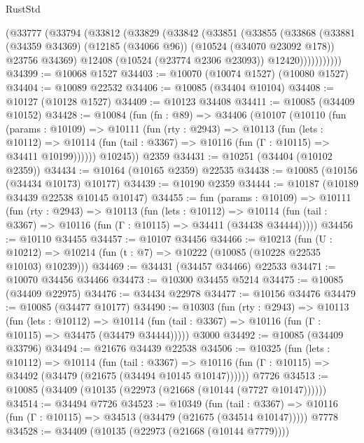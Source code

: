 \begin{lexlean}{RustStd}
\begin{coremodule}
          (@33777
            (@33794
              (@33812
                (@33829
                  (@33842
                    (@33851
                      (@33855
                        (@33868
                          (@33881
                            (@34359 @34369)
                            (@12185 (@34066 @96))
                            (@10524 (@34070 @23092 @178))
                            @23756
                            @34369)
                          @12408
                          (@10524 (@23774 @2306 @23093))
                          @12420)))))))))))
@34399 := @10068 @1527
@34403 := @10070 (@10074 @1527) (@10080 @1527)
@34404 := @10089 @22532
@34406 := @10085 (@34404 @10104)
@34408 := @10127 (@10128 @1527)
@34409 := @10123 @34408
@34411 := @10085 (@34409 @10152)
@34428 := @10084
    (fun (fn : @89) =>
    @34406
      (@10107
        (@10110
          (fun (params : @10109) =>
          @10111
            (fun (rty : @2943) =>
            @10113
              (fun (lets : @10112) =>
              @10114 (fun (tail : @3367) => @10116 (fun (Γ : @10115) => @34411 @10199))))))
        @10245))
    @2359
@34431 := @10251 (@34404 (@10102 @2359))
@34434 := @10164 (@10165 @2359) @22535
@34438 := @10085 (@10156 (@34434 @10173) @10177)
@34439 := @10190 @2359
@34444 := @10187 (@10189 @34439 @22538 @10145 @10147)
@34455 := fun (params : @10109) =>
  @10111
    (fun (rty : @2943) =>
    @10113
      (fun (lets : @10112) =>
      @10114 (fun (tail : @3367) => @10116 (fun (Γ : @10115) => @34411 (@34438 @34444)))))
@34456 := @10110 @34455
@34457 := @10107 @34456
@34466 := @10213
    (fun (U : @10212) => @10214 (fun (t : @7) => @10222 (@10085 (@10228 @22535 @10103) @10239)))
@34469 := @34431 (@34457 @34466) @22533
@34471 := @10070 @34456 @34466
@34473 := @10300 @34455 @5214
@34475 := @10085 (@34409 @22975)
@34476 := @34434 @22978
@34477 := @10156 @34476
@34479 := @10085 (@34477 @10177)
@34490 := @10303
    (fun (rty : @2943) =>
    @10113
      (fun (lets : @10112) =>
      @10114 (fun (tail : @3367) => @10116 (fun (Γ : @10115) => @34475 (@34479 @34444)))))
    @3000
@34492 := @10085 (@34409 @33796)
@34494 := @21676 @34439 @22538
@34506 := @10325
    (fun (lets : @10112) =>
    @10114
      (fun (tail : @3367) =>
      @10116 (fun (Γ : @10115) => @34492 (@34479 (@21675 (@34494 @10145 @10147))))))
    @7726
@34513 := @10085 (@34409 (@10135 (@22973 (@21668 (@10144 (@7727 @10147))))))
@34514 := @34494 @7726
@34523 := @10349
    (fun (tail : @3367) => @10116 (fun (Γ : @10115) => @34513 (@34479 (@21675 (@34514 @10147)))))
    @7778
@34528 := @34409 (@10135 (@22973 (@21668 (@10144 @7779))))

\end{coremodule}
\end{lexlean}
